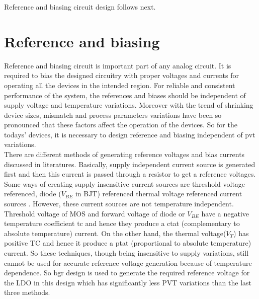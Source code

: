 \documentclass[12pt,a4paper,UKenglish]{article}
\begin{document}
Reference and biasing circuit design follows next. \\


\clearpage
\newpage

\section{Reference and biasing}

Reference and biasing circuit is important part of any analog circuit. It is required to bias the designed circuitry with proper voltages and currents for operating all the devices in the intended region. For reliable and consistent  performance of the system, the references and biases should be independent of supply voltage and temperature variations. Moreover with the trend of shrinking device sizes, mismatch and process parameters variations have been so pronounced that these factors affect the operation of the devices. So for the todays' devices, it is necessary to design reference and biasing independent of \acrshort{pvt} variations. \\

There are different methods of generating reference voltages and bias currents discussed in literatures. Basically, supply independent current source is generated first and then this current is passed through a resistor to get a reference voltages. Some ways of creating supply insensitive current sources are threshold voltage referenced, diode ($V_{BE}$ in BJT) referenced thermal voltage referenced current sources \cite[pp. 305-315]{gray_2009}. However, these current sources are not temperature independent. Threshold voltage of MOS and forward voltage of diode or $V_{BE}$ have a negative temperature coefficient \acrshort{tc}  and hence they produce a \acrshort{ctat} (complementary to absolute temperature) current. On the other hand, the thermal voltage($V_T$) has positive TC and hence it produce a \acrshort{ptat} (proportional to absolute temperature) current. So these techniques, though being insensitive to supply variations, still cannot be used for accurate reference voltage generation because of temperature dependence. So \gls{bgr} design is used to generate the required reference voltage for the LDO in this design which has significantly less PVT variations than the last three methods.\\
\end{document}
